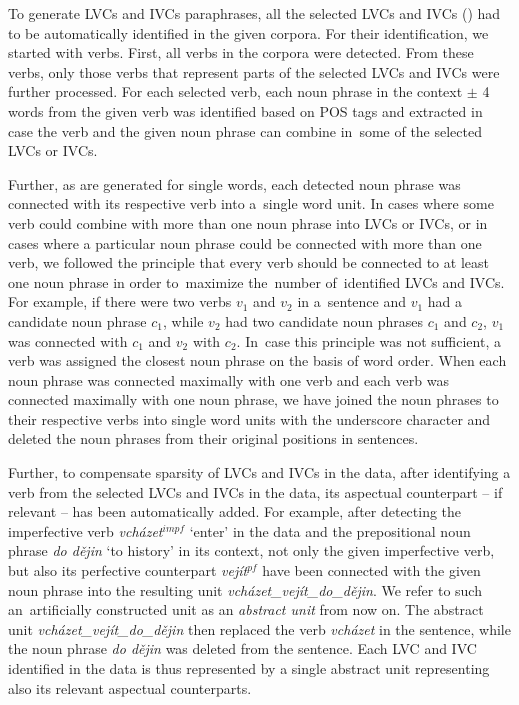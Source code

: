 \documentclass[output=paper
,modfonts
,nonflat]{langsci/langscibook}
\begin{document}
To generate LVCs and IVCs paraphrases, all the selected LVCs and IVCs () had to be automatically identified in the given corpora. 
For their identification, we started with verbs. First, all verbs in the 
corpora were detected. From these verbs, only those verbs that represent 
parts of the selected LVCs and IVCs were further processed. 
For each selected verb, each noun phrase in the context $\pm$ 4 words
from the given verb was identified based on POS tags and extracted 
in case the verb and the given noun phrase can combine in~some of the selected 
LVCs or IVCs.

Further, as  are generated for single words, each detected noun 
phrase was connected with its respective verb into a~single word unit. In cases where some verb could combine with more than one noun phrase into LVCs or IVCs, 
or in cases where a particular noun phrase could be connected with more than one 
verb, we followed the principle that every verb should be connected to at 
least one noun phrase  in order to~maximize the~number of~identified LVCs and 
IVCs. 
For example, if there were two verbs $v_1$ and $v_2$ in a~sentence and $v_1$ 
had a candidate noun phrase $c_1$, while $v_2$ had two candidate noun phrases 
$c_1$ and $c_2$,  $v_1$ was connected with $c_1$ and $v_2$ with $c_2$. In~case 
this principle was not sufficient, a verb was assigned the closest noun phrase 
on the basis of word order. When each noun phrase was connected maximally with 
one verb and each verb was connected maximally with one noun phrase, we have 
joined the noun phrases to their respective verbs into single word units with 
the underscore character and deleted the noun phrases from their original 
positions in sentences.

Further, to compensate sparsity of LVCs and IVCs in the data, after identifying 
a verb from the selected LVCs and IVCs in the data, its aspectual counterpart 
-- if relevant -- has been automatically added. For example, after detecting 
the imperfective verb \textit{vcházet}$^{impf}$ `enter' in the data and the 
prepositional noun phrase \textit{do dějin} `to history' in its context, not 
only the given imperfective verb, but also its perfective counterpart 
\textit{vejít}$^{pf}$ have been connected with the given noun phrase into the 
resulting unit \textit{vcházet\_vejít\_do\_dějin}. We refer to such 
an~artificially constructed unit as an \emph{abstract unit} from now on. The 
abstract unit \textit{vcházet\_vejít\_do\_dějin} then replaced the verb 
\textit{vcházet} in the sentence, while the noun phrase \textit{do dějin} 
was deleted from the sentence. Each LVC and IVC identified in the data is thus 
represented by a single abstract unit representing also its relevant aspectual 
counterparts. 
\end{document}
